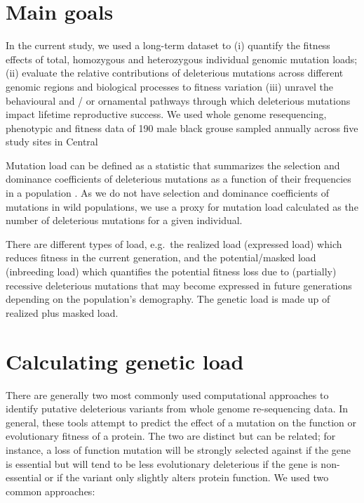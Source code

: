 \documentclass[
  letterpaper,
  DIV=11,
  numbers=noendperiod]{scrreprt}
\begin{document}

\chapter{Main goals}\label{main-goals}

In the current study, we used a long-term dataset to (i) quantify the
fitness effects of total, homozygous and heterozygous individual genomic
mutation loads; (ii) evaluate the relative contributions of deleterious
mutations across different genomic regions and biological processes to
fitness variation (iii) unravel the behavioural and / or ornamental
pathways through which deleterious mutations impact lifetime
reproductive success. We used whole genome resequencing, phenotypic and
fitness data of 190 male black grouse sampled annually across five study
sites in Central

Mutation load can be defined as a statistic that summarizes the
selection and dominance coefficients of deleterious mutations as a
function of their frequencies in a population
\autocite{bertorelleGeneticLoadGenomic2022}. As we do not have selection
and dominance coefficients of mutations in wild populations, we use a
proxy for mutation load calculated as the number of deleterious
mutations for a given individual.

There are different types of load, e.g.~the realized load (expressed
load) which reduces fitness in the current generation, and the
potential/masked load (inbreeding load) which quantifies the potential
fitness loss due to (partially) recessive deleterious mutations that may
become expressed in future generations depending on the population's
demography. The genetic load is made up of realized plus masked load.


\chapter{Calculating genetic load}\label{calculating-genetic-load}

There are generally two most commonly used computational approaches to
identify putative deleterious variants from whole genome re-sequencing
data. In general, these tools attempt to predict the effect of a
mutation on the function or evolutionary fitness of a protein. The two
are distinct but can be related; for instance, a loss of function
mutation will be strongly selected against if the gene is essential but
will tend to be less evolutionary deleterious if the gene is
non-essential or if the variant only slightly alters protein function.
We used two common approaches:
\end{document}
